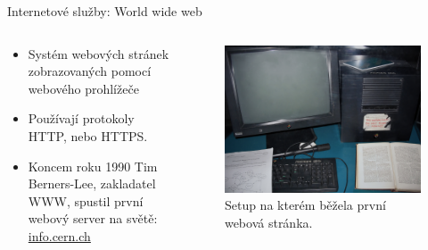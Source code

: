 \documentclass[aspectratio=169,xcolor=dvipsnames, t]{beamer}
\begin{document}
\begin{frame}{Internetové služby: World wide web}
    \vspace{-0.5cm}
    \begin{columns}
    \begin{column}{0.45\textwidth}
        \begin{itemize}
            \item Systém webových stránek zobrazovaných pomocí webového prohlížeče
            \item Používají protokoly HTTP, nebo HTTPS.
            \item Koncem roku 1990 Tim Berners-Lee, zakladatel WWW, spustil první webový server na světě: \href{https://info.cern.ch/}{info.cern.ch}
        \end{itemize}
\end{column}
\begin{column}{0.45\textwidth}
    \begin{figure}
        \includegraphics[width=\textwidth]{fw}
        \caption{Setup na kterém běžela první webová stránka.}
    \end{figure}
\end{column}
\end{columns}
\end{frame}
\end{document}
